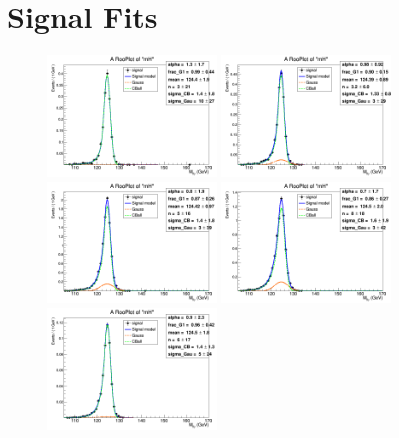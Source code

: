 \chapter{Signal Fits}


\begin{figure}
	\begin{center}
		\includegraphics[width=0.40\textwidth]{fig/signal_fit/2017/sigfit_ele_ggF_1_125.png}
		\includegraphics[width=0.40\textwidth]{fig/signal_fit/2017/sigfit_ele_ggF_2_125.png}\\
		\includegraphics[width=0.40\textwidth]{fig/signal_fit/2017/sigfit_ele_ggF_3_125.png}
		\includegraphics[width=0.40\textwidth]{fig/signal_fit/2017/sigfit_ele_ggF_4_125.png}\\
		\includegraphics[width=0.40\textwidth]{fig/signal_fit/2017/sigfit_ele_VBF_501_125.png}

\end{center}
\end{figure}
